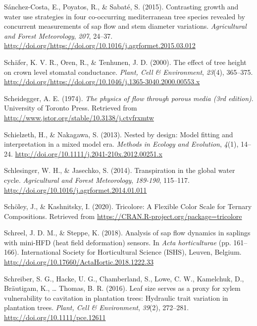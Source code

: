 \documentclass[11pt,twoside]{reedthesis}
\begin{document}
\hypertarget{ref-Sanchezcosta2015}{}
Sánchez-Costa, E., Poyatos, R., \& Sabaté, S. (2015). Contrasting growth
and water use strategies in four co-occurring mediterranean tree species
revealed by concurrent measurements of sap flow and stem diameter
variations. \emph{Agricultural and Forest Meteorology}, \emph{207},
24--37.
\url{http://doi.org/https://doi.org/10.1016/j.agrformet.2015.03.012}

\hypertarget{ref-Schafer2000}{}
Schäfer, K. V. R., Oren, R., \& Tenhunen, J. D. (2000). The effect of
tree height on crown level stomatal conductance. \emph{Plant, Cell \&
Environment}, \emph{23}(4), 365--375.
\url{http://doi.org/https://doi.org/10.1046/j.1365-3040.2000.00553.x}

\hypertarget{ref-Scheidegger1974}{}
Scheidegger, A. E. (1974). \emph{The physics of flow through porous
media (3rd edition)}. University of Toronto Press. Retrieved from
\url{http://www.jstor.org/stable/10.3138/j.ctvfrxmtw}

\hypertarget{ref-Schielzeth2013}{}
Schielzeth, H., \& Nakagawa, S. (2013). Nested by design: Model fitting
and interpretation in a mixed model era. \emph{Methods in Ecology and
Evolution}, \emph{4}(1), 14--24.
\url{http://doi.org/10.1111/j.2041-210x.2012.00251.x}

\hypertarget{ref-Schlesinger2014}{}
Schlesinger, W. H., \& Jasechko, S. (2014). Transpiration in the global
water cycle. \emph{Agricultural and Forest Meteorology}, \emph{189-190},
115--117. \url{http://doi.org/10.1016/j.agrformet.2014.01.011}

\hypertarget{ref-scholey_tricolore_2020}{}
Schöley, J., \& Kashnitsky, I. (2020). Tricolore: A Flexible Color Scale
for Ternary Compositions. Retrieved from
\url{https://CRAN.R-project.org/package=tricolore}

\hypertarget{ref-Schreel2018}{}
Schreel, J. D. M., \& Steppe, K. (2018). Analysis of sap flow dynamics
in saplings with mini-HFD (heat field deformation) sensors. In
\emph{Acta horticulturae} (pp. 161--166). International Society for
Horticultural Science (ISHS), Leuven, Belgium.
\url{http://doi.org/10.17660/ActaHortic.2018.1222.33}

\hypertarget{ref-schreiber_leaf_2016}{}
Schreiber, S. G., Hacke, U. G., Chamberland, S., Lowe, C. W., Kamelchuk,
D., Bräutigam, K., \ldots{} Thomas, B. R. (2016). Leaf size serves as a
proxy for xylem vulnerability to cavitation in plantation trees:
Hydraulic trait variation in plantation trees. \emph{Plant, Cell \&
Environment}, \emph{39}(2), 272--281.
\url{http://doi.org/10.1111/pce.12611}
\end{document}
